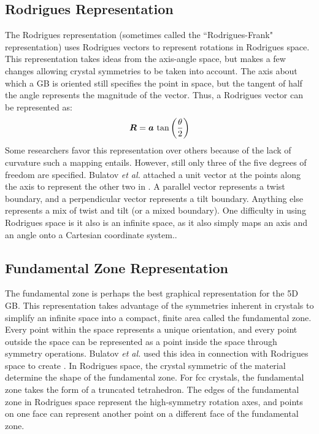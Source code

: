 \documentclass[twoside,senior]{BYUPhys}
\begin{document}
\subsection{Rodrigues Representation\label{GBReps:Rodrigues}}
The Rodrigues representation (sometimes called the ``Rodrigues-Frank" representation) uses Rodrigues vectors to represent rotations in Rodrigues space.  This representation takes ideas from the axis-angle space, but makes a few changes allowing crystal symmetries to be taken into account.  The axis about which a GB is oriented still specifies the point in space, but the tangent of half the angle represents the magnitude of the vector. Thus, a Rodrigues vector can be represented as:\cite{morawiec1996, becker1989, frank1988, randle2000, priester2013}
\begin{equation}
\bm{R}=\bm{a}\ \textnormal{tan}\left(\frac{\theta}{2}\right)
\label{eq:rodriguesVec}
\end{equation}
Some researchers favor this representation over others because of the lack of curvature such a mapping entails.\cite{frank1988, randle2000}  However, still only three of the five degrees of freedom are specified.  Bulatov \emph{et al.} attached a unit vector at the points along the axis to represent the other two in . A parallel vector represents a twist boundary, and a perpendicular vector represents a tilt boundary.  Anything else represents a mix of twist and tilt (or a mixed boundary).  One difficulty in using Rodrigues space is it also is an infinite space, as it also simply maps an axis and an angle onto a Cartesian coordinate system.\cite{frank1988, kirch2008}.

\subsection{Fundamental Zone Representation\label{GBReps:FunZone}}
The fundamental zone is perhaps the best graphical representation for the 5D GB.  This representation takes advantage of the symmetries inherent in crystals\cite{stokes2007} to simplify an infinite space into a compact, finite area called the fundamental zone.\cite{bulatov2014, patala2013, homer2015, morawiec1996, patala2012}  Every point within the space represents a unique orientation, and every point outside the space can be represented as a point inside the space through symmetry operations.\cite{morawiec1996, becker1989, frank1988}  Bulatov \emph{et al.} used this idea in connection with Rodrigues space to create .  In Rodrigues space, the crystal symmetric of the material determine the shape of the fundamental zone.\cite{patala2013, morawiec1996}  For fcc crystals, the fundamental zone takes the form of a truncated tetrahedron.\cite{bulatov2014}  The edges of the fundamental zone in Rodrigues space represent the high-symmetry rotation axes, and points on one face can represent another point on a different face of the fundamental zone.  
\end{document}
